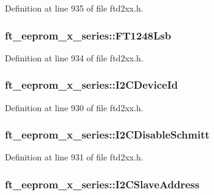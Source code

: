 Definition at line 935 of file ftd2xx.h.\hypertarget{structft__eeprom__x__series_aed8eaabb6019562d67ab10a65d018376}{
\subsubsection[{FT1248Lsb}]{ {\bf ft\_\-eeprom\_\-x\_\-series::FT1248Lsb}}}
\label{structft__eeprom__x__series_aed8eaabb6019562d67ab10a65d018376}


Definition at line 934 of file ftd2xx.h.\hypertarget{structft__eeprom__x__series_ab997d186140523a48b9b1186a9ef6f41}{
\subsubsection[{I2CDeviceId}]{ {\bf ft\_\-eeprom\_\-x\_\-series::I2CDeviceId}}}
\label{structft__eeprom__x__series_ab997d186140523a48b9b1186a9ef6f41}


Definition at line 930 of file ftd2xx.h.\hypertarget{structft__eeprom__x__series_a1273bf5d26c7ef2f905ce6a1b3d936b4}{
\subsubsection[{I2CDisableSchmitt}]{ {\bf ft\_\-eeprom\_\-x\_\-series::I2CDisableSchmitt}}}
\label{structft__eeprom__x__series_a1273bf5d26c7ef2f905ce6a1b3d936b4}


Definition at line 931 of file ftd2xx.h.\hypertarget{structft__eeprom__x__series_a41567e7ae1c0ee7b87957cade654d872}{
\subsubsection[{I2CSlaveAddress}]{ {\bf ft\_\-eeprom\_\-x\_\-series::I2CSlaveAddress}}}
\label{structft__eeprom__x__series_a41567e7ae1c0ee7b87957cade654d872}


